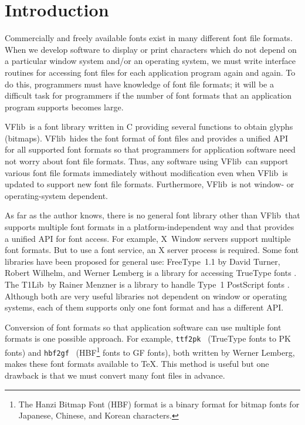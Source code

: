 \documentclass{cah-gut}
\newcommand{\pkg}[1]{\textsf{#1}}
\newcommand{\prog}[1]{\texttt{#1}}
\newcommand{\VFlib}{\pkg{VFlib}}
\newcommand{\freetype}{\pkg{FreeType}}
\newcommand{\tlib}{\pkg{T1Lib}}
\newcommand{\hbfgf}{\prog{hbf2gf}}
\newcommand{\ttfpk}{\prog{ttf2pk}}
\begin{document}

\section{Introduction}
\label{SEC:Introduction}

Commercially and freely available fonts exist in many
different font file formats.  When we develop software to display or
print characters which do not depend on a particular window system 
and/or an operating system, we must write interface routines for 
accessing font files for each application program again and again.  
To do this, programmers must have knowledge of font file formats; 
it will be a difficult task for programmers if the number of font 
formats that an application program supports becomes large.

\VFlib\ is a font library written in C providing several functions to
obtain glyphs (bitmaps).  \VFlib\ hides the font format of font
files and provides a unified API for all supported font formats so
that programmers for application software need not worry about
font file formats.  Thus, any software using \VFlib\ can support
various font file formats immediately without modification even when
\VFlib\ is updated to support new font file formats.  
Furthermore, \VFlib\ is not window- or operating-system dependent. 

As far as the author knows, there is no general font library other than
\VFlib\ that supports multiple font formats in a platform-independent
way and that provides a unified API for font access.
For example, X~Window servers support multiple font formats.
But to use a font service, an X server process is required.  
Some font libraries have been proposed for general use: 
\freetype\ 1.1 by David Turner, Robert Wilhelm, and Werner Lemberg is a 
library for accessing TrueType fonts \cite{FreeType}. 
The \tlib\ by Rainer Menzner is a library to handle
Type~1 PostScript fonts \cite{TypeOneLib}.  
Although both are very useful libraries not dependent on 
window or operating systems, each of them supports only one 
font format and has a different API.

Conversion of font formats so that application software can use 
multiple font formats is one possible approach.  For example,
\ttfpk\ \cite{TTFTOPK} (TrueType fonts to PK fonts) 
and \hbfgf\ \cite{HBFTOGF} (HBF\footnote{
    The Hanzi Bitmap Font (HBF) format \cite{HBFspecs} 
    is a binary format for bitmap fonts for 
    Japanese, Chinese, and Korean characters.
}
fonts to GF fonts), 
both written by Werner Lemberg, makes these font formats 
available to \TeX. This method is useful but one drawback 
is that we must convert many font files in advance.
\end{document}
